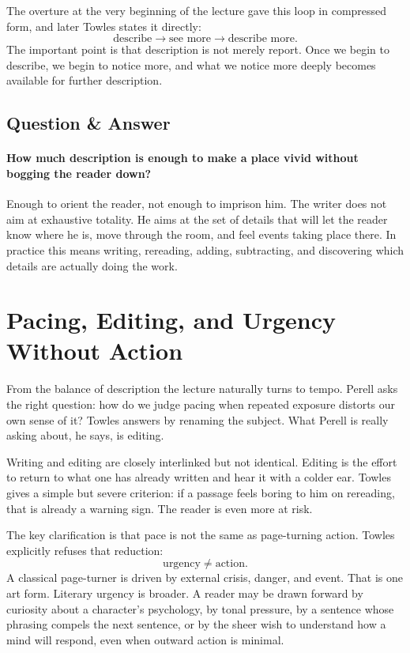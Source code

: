 The overture at the very beginning of the lecture gave this loop in compressed form, and later Towles states it directly:
\begin{equation}
\text{describe} \longrightarrow \text{see more} \longrightarrow \text{describe more}.
\end{equation}
The important point is that description is not merely report. Once we begin to describe, we begin to notice more, and what we notice more deeply becomes available for further description.

\subsection{Question \& Answer}

\paragraph{How much description is enough to make a place vivid without bogging the reader down?}

Enough to orient the reader, not enough to imprison him. The writer does not aim at exhaustive totality. He aims at the set of details that will let the reader know where he is, move through the room, and feel events taking place there. In practice this means writing, rereading, adding, subtracting, and discovering which details are actually doing the work.

\section{Pacing, Editing, and Urgency Without Action}

From the balance of description the lecture naturally turns to tempo. Perell asks the right question: how do we judge pacing when repeated exposure distorts our own sense of it? Towles answers by renaming the subject. What Perell is really asking about, he says, is editing.

Writing and editing are closely interlinked but not identical. Editing is the effort to return to what one has already written and hear it with a colder ear. Towles gives a simple but severe criterion: if a passage feels boring to him on rereading, that is already a warning sign. The reader is even more at risk.

The key clarification is that pace is not the same as page-turning action. Towles explicitly refuses that reduction:
\begin{equation}
\text{urgency} \neq \text{action}.
\end{equation}
A classical page-turner is driven by external crisis, danger, and event. That is one art form. Literary urgency is broader. A reader may be drawn forward by curiosity about a character's psychology, by tonal pressure, by a sentence whose phrasing compels the next sentence, or by the sheer wish to understand how a mind will respond, even when outward action is minimal.

